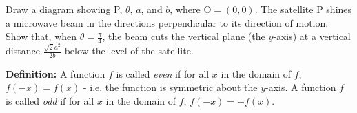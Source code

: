 \documentclass{exam}
\begin{document}
\begin{questions}
\begin{parts}
      \begin{subparts}
        \subpart
          Draw a diagram showing P, $ \theta $, $ a $, and $ b $, where $ \mathrm{O} = (0,0) $.
        \subpart
          The satellite P shines a microwave beam in the directions perpendicular
          to its direction of motion. Show that, when $ \theta = \frac{\pi}{4} $,
          the beam cuts the vertical plane (the $y$-axis) at a vertical distance
          $ \frac{\sqrt{2}a^2}{2b} $ below the level of the satellite.
      \end{subparts}
  \end{parts}

  \textbf{Definition:} A function $ f $ is called \emph{even} if for all $ x $ in
  the domain of $ f $, $ f(-x) = f(x) $ - i.e. the function is symmetric about the
  $y$-axis. A function $ f $ is called \emph{odd} if for all $ x $ in the domain of
  $ f $, $ f(-x) = -f(x) $.

\end{questions}
\end{document}
